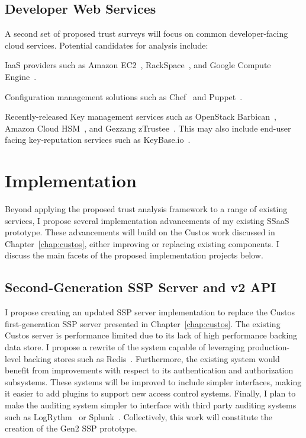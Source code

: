 \subsection{Developer Web Services}

A second set of proposed trust surveys will focus on common
developer-facing cloud services. Potential candidates for analysis
include:

\begin{packed_item}
\item IaaS providers such as Amazon EC2~\cite{amazon-ec2},
  RackSpace~\cite{rackspace-compute}, and Google Compute
  Engine~\cite{google-compute}.
\item Configuration management solutions such as Chef~\cite{chef} and
  Puppet~\cite{puppet}.
\item Recently-released Key management services such as OpenStack
  Barbican~\cite{openstack-barbican}, Amazon Cloud
  HSM~\cite{amazon-hsm}, and Gezzang zTrustee~\cite{gazzang}. This may
  also include end-user facing key-reputation services such as
  KeyBase.io~\cite{keybase}.
\end{packed_item}

\section{Implementation}
\label{chap:planned:implement}

Beyond applying the proposed trust analysis framework to a range of
existing services, I propose several implementation advancements of my
existing SSaaS prototype. These advancements will build on the Custos
work discussed in Chapter~\ref{chap:custos}, either improving or
replacing existing components. I discuss the main facets of the
proposed implementation projects below.

\subsection{Second-Generation SSP Server and v2 API}

I propose creating an updated SSP server implementation to replace the
Custos first-generation SSP server presented in
Chapter~\ref{chap:custos}. The existing Custos server is performance
limited due to its lack of high performance backing data store. I
propose a rewrite of the system capable of leveraging production-level
backing stores such as Redis~\cite{redis}. Furthermore, the existing
system would benefit from improvements with respect to its
authentication and authorization subsystems. These systems will be
improved to include simpler interfaces, making it easier to add
plugins to support new access control systems. Finally, I plan to make
the auditing system simpler to interface with third party auditing
systems such as LogRythm~\cite{logrythm} or
Splunk~\cite{splunk}. Collectively, this work will constitute the
creation of the Gen2 SSP prototype.

